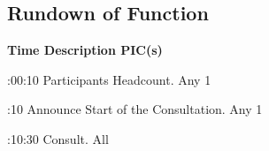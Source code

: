 \pagebreak
\subsection{Rundown of Function}

\setupTABLE[c][1][width=1.25in]
\setupTABLE[c][2][width=3.5in]
\setupTABLE[c][3][width=1.25in]
\bTABLE
\bTABLEhead

\bTR\bTH    \bf{Time}
\eTH\bTH    \bf{Description}
\eTH\bTH    \bf{PIC(s)}
\eTH\eTR

\eTABLEhead
\bTABLEbody

\bTR{}:00:10
\eTD\bTD Participants Headcount.
\eTD\bTD Any 1
\eTD\eTR

\bTR{}:10
\eTD\bTD Announce Start of the Consultation.
\eTD\bTD Any 1
\eTD\eTR

\bTR{}:10:30
\eTD\bTD Consult.
\eTD\bTD All
\eTD\eTR

\eTABLEbody
\eTABLE

\pagebreak
